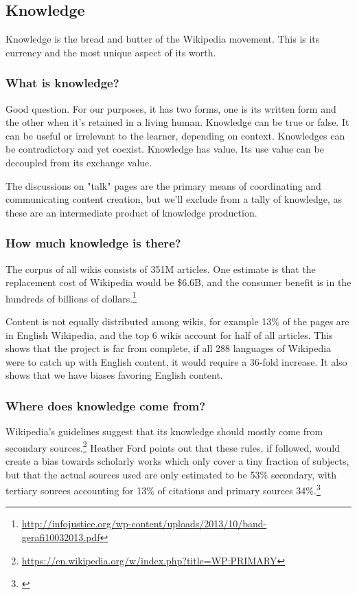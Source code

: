 \subsection{Knowledge}

Knowledge is the bread and butter of the Wikipedia movement. This is its currency and the most unique aspect of its worth.

\subsubsection{What is knowledge?}

Good question.  For our purposes, it has two forms, one is its written form and the other when it's retained in a living human.  Knowledge can be true or false.  It can be useful or irrelevant to the learner, depending on context.  Knowledges can be contradictory and yet coexist.  Knowledge has value.  Its use value can be decoupled from its exchange value.

The discussions on "talk" pages are the primary means of coordinating and communicating content creation, but we'll exclude from a tally of knowledge, as these are an intermediate product of knowledge production.

\subsubsection{How much knowledge is there?}

The corpus of all wikis consists of 351M articles.  One estimate is that the replacement cost of Wikipedia would be \$6.6B, and the consumer benefit is in the hundreds of billions of dollars.\footnote{\url{http://infojustice.org/wp-content/uploads/2013/10/band-gerafi10032013.pdf}}

Content is not equally distributed among wikis, for example 13\% of the pages are in English Wikipedia, and the top 6 wikis account for half of all articles.  This shows that the project is far from complete, if all 288 languages of Wikipedia were to catch up with English content, it would require a 36-fold increase.  It also shows that we have biases favoring English content.

\subsubsection{Where does knowledge come from?}

Wikipedia's guidelines suggest that its knowledge should mostly come from secondary sources.\footnote{\url{https://en.wikipedia.org/w/index.php?title=WP:PRIMARY}}  Heather Ford points out that these rules, if followed, would create a bias towards scholarly works which only cover a tiny fraction of subjects, but that the actual sources used are only estimated to be 53\% secondary, with tertiary sources accounting for 13\% of citations and primary sources 34\%.\footnote{\citet{Ford2013}}

